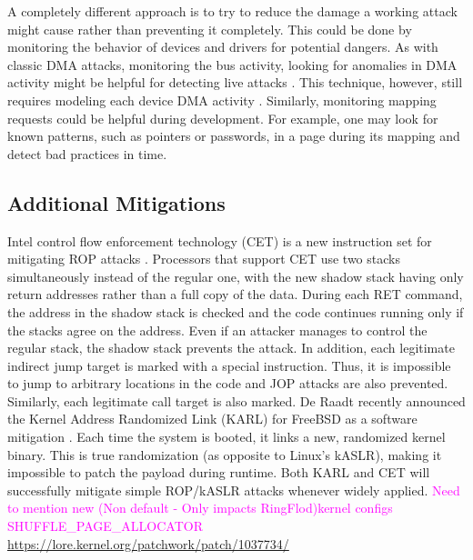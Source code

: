 A completely different approach is to try to reduce the damage a working attack might cause rather than preventing it completely. This could be done by monitoring the behavior of devices and drivers for potential dangers. As with classic DMA attacks, monitoring the bus activity, looking for anomalies in DMA activity might be helpful for detecting live attacks \cite{Ste13}. This technique, however, still requires modeling each device DMA activity \cite{Ste14}. Similarly, monitoring mapping requests could be helpful during development. For example, one may look for known patterns, such as pointers or passwords, in a page during its mapping and detect bad practices in time.
\subsection{Additional Mitigations}
Intel control flow enforcement technology (CET) is a new instruction set for mitigating ROP attacks \cite{Int17}. Processors that support CET use two stacks simultaneously instead of the regular one, with the new shadow stack having only return addresses rather than a full copy of the data. During each RET command, the address in the shadow stack is checked and the code continues running only if the stacks agree on the address. Even if an attacker manages to control the regular stack, the shadow stack prevents the attack. In addition, each legitimate indirect jump target is marked with a special instruction. Thus, it is impossible to jump to arbitrary locations in the code and JOP attacks are also prevented. Similarly, each legitimate call target is also marked. De Raadt recently announced the Kernel Address Randomized Link (KARL) for FreeBSD as a software mitigation \cite{dr17}. Each time the system is booted, it links a new, randomized kernel binary. This is true randomization (as opposite to Linux’s kASLR), making it impossible to patch the payload during runtime. Both KARL and CET will successfully mitigate simple ROP/kASLR attacks whenever widely applied. 
\textcolor{magenta}{Need to mention new (Non default - Only impacts RingFlod)kernel configs SHUFFLE\_PAGE\_ALLOCATOR \url{https://lore.kernel.org/patchwork/patch/1037734/}}
